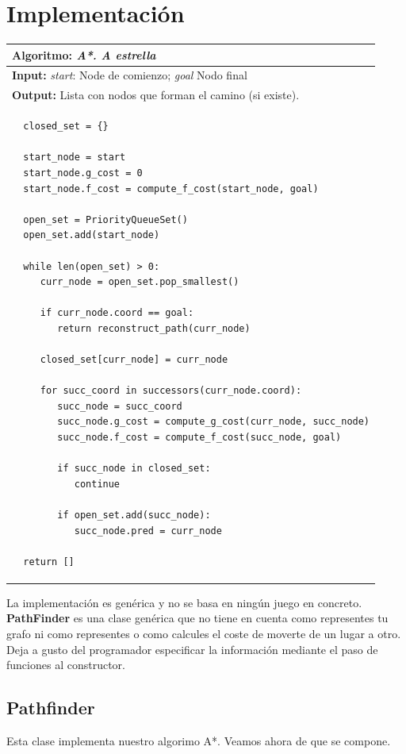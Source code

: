 \documentclass[a4paper,12pt,oneside]{book}
\begin{document}
\section {Implementación}
\begin{tabular}{  p{13cm}  }
  \hline    \hline                    
{\bf Algoritmo:} {\it A*. A estrella}\\  \hline     
{\bf Input:} {\it start}: Node de comienzo; {\it goal} Nodo final\\  \hline     
{\bf Output:} Lista con nodos que forman el camino (si existe).\\  \hline     

  \hline  \hline 
\begin{lstlisting}
  closed_set = {}
        
  start_node = start
  start_node.g_cost = 0
  start_node.f_cost = compute_f_cost(start_node, goal)
        
  open_set = PriorityQueueSet()
  open_set.add(start_node)
        
  while len(open_set) > 0:
     curr_node = open_set.pop_smallest()
            
     if curr_node.coord == goal:
        return reconstruct_path(curr_node)
            
     closed_set[curr_node] = curr_node
            
     for succ_coord in successors(curr_node.coord):
        succ_node = succ_coord
        succ_node.g_cost = compute_g_cost(curr_node, succ_node)
        succ_node.f_cost = compute_f_cost(succ_node, goal)
                
        if succ_node in closed_set:
           continue
                   
        if open_set.add(succ_node):
           succ_node.pred = curr_node
        
  return []
\end{lstlisting} 
\end{tabular}


La implementación es genérica y no se basa en ningún juego en
concreto. {\bf PathFinder} es una clase genérica que no tiene en
cuenta como representes tu grafo ni como representes o como calcules
el coste de moverte de un lugar a otro. Deja a gusto del programador
especificar la información mediante el paso de funciones al constructor.

\subsection{Pathfinder}
Esta clase implementa nuestro algorimo A*. Veamos ahora de que se compone.
\end{document}
